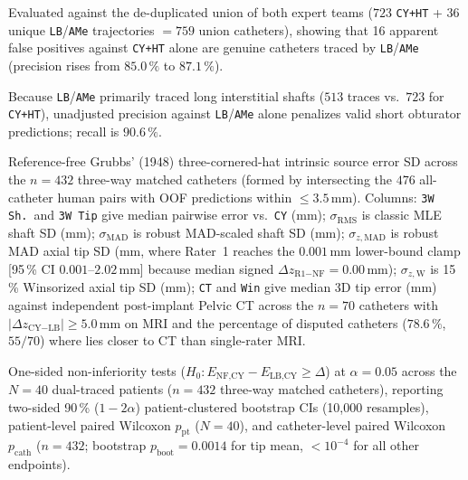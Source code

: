 \begin{table}[tbp]
\begin{threeparttable}
\begin{tablenotes}[flushleft]
\item[b] Evaluated against the de-duplicated union of both expert teams ($723$ \texttt{CY+HT} + $36$ unique \texttt{LB}/\texttt{AMe} trajectories $= 759$ union catheters), showing that 16 apparent false positives against \texttt{CY+HT} alone are genuine catheters traced by \texttt{LB}/\texttt{AMe} (precision rises from $85.0\,\%$ to $87.1\,\%$).
\item[c] Because \texttt{LB}/\texttt{AMe} primarily traced long interstitial shafts ($513$ traces vs.\ $723$ for \texttt{CY+HT}), unadjusted precision against \texttt{LB}/\texttt{AMe} alone penalizes valid short obturator predictions; recall is $90.6\,\%$.
\item[d] Reference-free Grubbs' (1948) three-cornered-hat intrinsic source error SD across the $n=432$ three-way matched catheters (formed by intersecting the $476$ all-catheter human pairs with OOF \NF{} predictions within $\le 3.5$\,mm). Columns: \texttt{3W Sh.}\ and \texttt{3W Tip} give median pairwise error vs.\ \texttt{CY} (mm); $\sigma_{\text{RMS}}$ is classic MLE shaft SD (mm); $\sigma_{\text{MAD}}$ is robust MAD-scaled shaft SD (mm); $\sigma_{z,\text{MAD}}$ is robust MAD axial tip SD (mm, where Rater~1 reaches the $0.001$\,mm lower-bound clamp [95\,\% CI $0.001\text{--}2.02$\,mm] because median signed $\Delta z_{\text{R1}-\text{NF}} = 0.00$\,mm); $\sigma_{z,\text{W}}$ is 15\,\% Winsorized axial tip SD (mm); \texttt{CT} and \texttt{Win} give median 3D tip error (mm) against independent post-implant Pelvic CT across the $n=70$ catheters with $|\Delta z_{\text{CY}-\text{LB}}| \ge 5.0$\,mm on MRI and the percentage of disputed catheters ($78.6\,\%$, $55/70$) where \NF{} lies closer to CT than single-rater MRI.
\item[e] One-sided non-inferiority tests ($H_0: E_{\text{NF},\text{CY}} - E_{\text{LB},\text{CY}} \ge \Delta$) at $\alpha=0.05$ across the $N=40$ dual-traced patients ($n=432$ three-way matched catheters), reporting two-sided 90\,\% ($1-2\alpha$) patient-clustered bootstrap CIs (10,000 resamples), patient-level paired Wilcoxon $p_{\text{pt}}$ ($N=40$), and catheter-level paired Wilcoxon $p_{\text{cath}}$ ($n=432$; bootstrap $p_{\text{boot}}=0.0014$ for tip mean, $<10^{-4}$ for all other endpoints).
\end{tablenotes}
\end{threeparttable}
\end{table}
